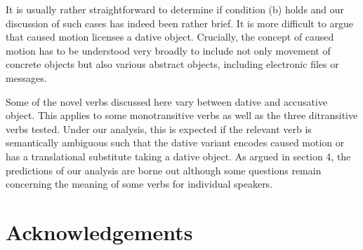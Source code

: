 \documentclass[output=paper,modfonts,nonflat]{langsci/langscibook}
\begin{document}
It is usually rather straightforward to determine if condition (b) holds and our discussion of such cases has indeed been rather brief. It is more difficult to argue that caused motion licenses a dative object. Crucially, the concept of caused motion has to be understood very broadly to include not only movement of concrete objects but also various abstract objects, including electronic files or messages. 

Some of the novel verbs discussed here vary between dative and accusative object. This applies to some monotransitive verbs as well as the three ditransitive verbs tested. Under our analysis, this is expected if the relevant verb is semantically ambiguous such that the dative variant encodes caused motion or has a translational substitute taking a dative object. As argued in section 4, the predictions of our analysis are borne out although some questions remain concerning the meaning of some verbs for individual speakers. 

\section{Acknowledgements}
\end{document}
